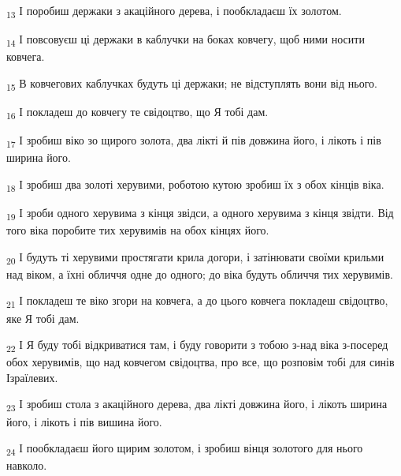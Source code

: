 \begin{tcolorbox}
\textsubscript{13} І поробиш держаки з акаційного дерева, і пообкладаєш їх золотом.
\end{tcolorbox}
\begin{tcolorbox}
\textsubscript{14} І повсовуєш ці держаки в каблучки на боках ковчегу, щоб ними носити ковчега.
\end{tcolorbox}
\begin{tcolorbox}
\textsubscript{15} В ковчегових каблучках будуть ці держаки; не відступлять вони від нього.
\end{tcolorbox}
\begin{tcolorbox}
\textsubscript{16} І покладеш до ковчегу те свідоцтво, що Я тобі дам.
\end{tcolorbox}
\begin{tcolorbox}
\textsubscript{17} І зробиш віко зо щирого золота, два лікті й пів довжина його, і лікоть і пів ширина його.
\end{tcolorbox}
\begin{tcolorbox}
\textsubscript{18} І зробиш два золоті херувими, роботою кутою зробиш їх з обох кінців віка.
\end{tcolorbox}
\begin{tcolorbox}
\textsubscript{19} І зроби одного херувима з кінця звідси, а одного херувима з кінця звідти. Від того віка поробите тих херувимів на обох кінцях його.
\end{tcolorbox}
\begin{tcolorbox}
\textsubscript{20} І будуть ті херувими простягати крила догори, і затінювати своїми крильми над віком, а їхні обличчя одне до одного; до віка будуть обличчя тих херувимів.
\end{tcolorbox}
\begin{tcolorbox}
\textsubscript{21} І покладеш те віко згори на ковчега, а до цього ковчега покладеш свідоцтво, яке Я тобі дам.
\end{tcolorbox}
\begin{tcolorbox}
\textsubscript{22} І Я буду тобі відкриватися там, і буду говорити з тобою з-над віка з-посеред обох херувимів, що над ковчегом свідоцтва, про все, що розповім тобі для синів Ізраїлевих.
\end{tcolorbox}
\begin{tcolorbox}
\textsubscript{23} І зробиш стола з акаційного дерева, два лікті довжина його, і лікоть ширина його, і лікоть і пів вишина його.
\end{tcolorbox}
\begin{tcolorbox}
\textsubscript{24} І пообкладаєш його щирим золотом, і зробиш вінця золотого для нього навколо.
\end{tcolorbox}
